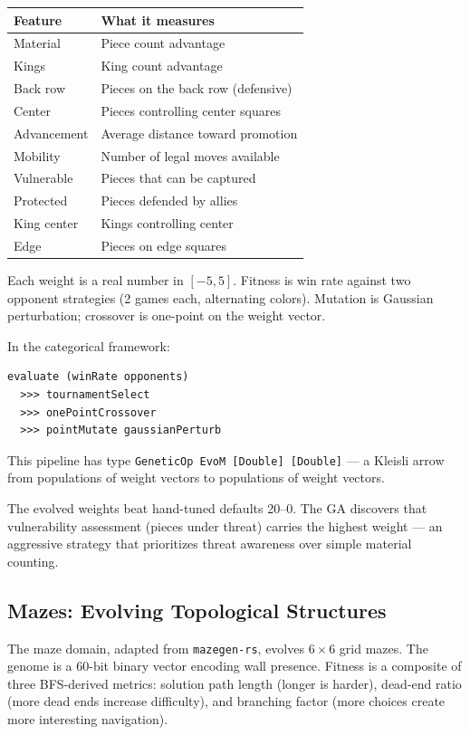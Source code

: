 \documentclass[10pt]{article}
\begin{document}
\begin{table}[ht]
\centering
\begin{tabular}{@{}ll@{}}
\toprule
\textbf{Feature} & \textbf{What it measures} \\
\midrule
Material    & Piece count advantage \\
Kings       & King count advantage \\
Back row    & Pieces on the back row (defensive) \\
Center      & Pieces controlling center squares \\
Advancement & Average distance toward promotion \\
Mobility    & Number of legal moves available \\
Vulnerable  & Pieces that can be captured \\
Protected   & Pieces defended by allies \\
King center & Kings controlling center \\
Edge        & Pieces on edge squares \\
\bottomrule
\end{tabular}
\end{table}

Each weight is a real number in $[-5, 5]$. Fitness is win rate against two opponent strategies (2 games each, alternating colors). Mutation is Gaussian perturbation; crossover is one-point on the weight vector.

In the categorical framework:

\begin{lstlisting}[style=plainstyle]
evaluate (winRate opponents)
  >>> tournamentSelect
  >>> onePointCrossover
  >>> pointMutate gaussianPerturb
\end{lstlisting}

This pipeline has type \texttt{GeneticOp EvoM [Double] [Double]} --- a Kleisli arrow from populations of weight vectors to populations of weight vectors.

The evolved weights beat hand-tuned defaults 20--0. The GA discovers that vulnerability assessment (pieces under threat) carries the highest weight --- an aggressive strategy that prioritizes threat awareness over simple material counting.


\subsection{Mazes: Evolving Topological Structures}

The maze domain, adapted from \texttt{mazegen-rs}, evolves $6 \times 6$ grid mazes. The genome is a 60-bit binary vector encoding wall presence. Fitness is a composite of three BFS-derived metrics: solution path length (longer is harder), dead-end ratio (more dead ends increase difficulty), and branching factor (more choices create more interesting navigation).
\end{document}
